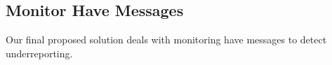 \subsection{Monitor Have Messages}

Our final proposed solution deals with monitoring have messages to detect underreporting.
